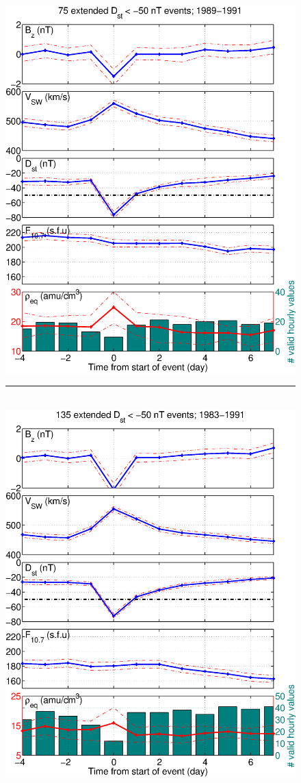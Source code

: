 \documentclass[12pt]{article}
\begin{document}
\begin{figure}[h]
\centering
\includegraphics[scale=0.40]{figures/stormavs-dst-50-tak-GOES6.eps}
\\
\rule[1ex]{5cm}{1pt}
\\
\includegraphics[scale=0.40]{figures/stormavs-dst-day-GOES6.eps}

\end{figure}
\end{document}
